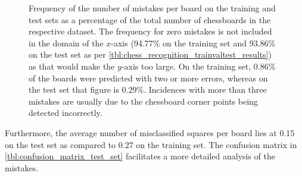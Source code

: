 \documentclass[../report.tex]{subfiles}
\begin{document}
\begin{figure}
{\begin{tikzpicture}
        \end{tikzpicture}
    }
    \caption[Frequency of the number of mistakes per board on the training and test sets.]{Frequency of the number of mistakes per board on the training and test sets as a percentage of the total number of chessboards in the respective dataset. The frequency for zero mistakes is not included in the domain of the $x$-axis (94.77\% on the training set and 93.86\% on the test set as per \cref{tbl:chess_recognition_trainvaltest_results}) as that would make the $y$-axis too large. On the training set, 0.86\% of the boards were predicted with two or more errors, whereas on the test set that figure is 0.29\%. Incidences with more than three mistakes are usually due to the chessboard corner points being detected incorrectly.}
    \label{fig:mistakes_frequency}
\end{figure}
Furthermore, the average number of misclassified squares per board lies at 0.15 on the test set as compared to 0.27 on the training set.
The confusion matrix in \cref{tbl:confusion_matrix_test_set} facilitates a more detailed analysis of the mistakes.
\end{document}

